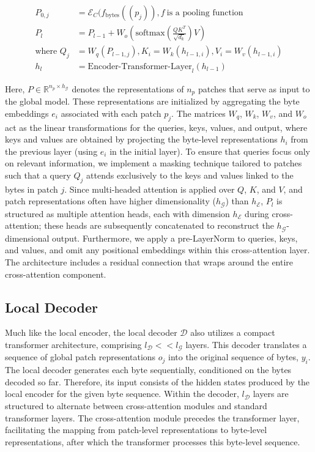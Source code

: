 \begin{align}
P_{0,j} &= \mathcal{E}_{C}(f_\text{bytes}((p_j)), f~ \text{is a pooling function} \\
P_l &= P_{l-1} + W_o\left(\text{softmax}\left(\frac{QK^T}{\sqrt{d_k}}\right)V\right) \\
\text{where } Q_j &= W_q(P_{l-1,j}), K_i = W_k(h_{l-1,i}), V_i = W_v(h_{l-1,i}) \\
h_l &= \text{Encoder-Transformer-Layer}_l(h_{l-1})
\end{align}

Here, $P \in \mathbb{R}^{n_p \times h_{\mathcal{G}}}$ denotes the representations of $n_p$ patches that serve as input to the global model. These representations are initialized by aggregating the byte embeddings $e_i$ associated with each patch $p_j$. The matrices $W_q$, $W_k$, $W_v$, and $W_o$ act as the linear transformations for the queries, keys, values, and output, where keys and values are obtained by projecting the byte-level representations $h_i$ from the previous layer (using $e_i$ in the initial layer). To ensure that queries focus only on relevant information, we implement a masking technique tailored to patches such that a query $Q_j$ attends exclusively to the keys and values linked to the bytes in patch $j$. Since multi-headed attention is applied over $Q$, $K$, and $V$, and patch representations often have higher dimensionality ($h_{\mathcal{G}}$) than $h_{\mathcal{E}}$, $P_l$ is structured as multiple attention heads, each with dimension $h_{\mathcal{E}}$ during cross-attention; these heads are subsequently concatenated to reconstruct the $h_{\mathcal{G}}$-dimensional output. Furthermore, we apply a pre-LayerNorm to queries, keys, and values, and omit any positional embeddings within this cross-attention layer. The architecture includes a residual connection that wraps around the entire cross-attention component.

\subsection{Local Decoder} 

Much like the local encoder, the local decoder $\mathcal{D}$ also utilizes a compact transformer architecture, comprising $l_{\mathcal{D}} << l_{\mathcal{G}}$ layers. This decoder translates a sequence of global patch representations $o_j$ into the original sequence of bytes, $y_i$. The local decoder generates each byte sequentially, conditioned on the bytes decoded so far. Therefore, its input consists of the hidden states produced by the local encoder for the given byte sequence. Within the decoder, $l_{\mathcal{D}}$ layers are structured to alternate between cross-attention modules and standard transformer layers. The cross-attention module precedes the transformer layer, facilitating the mapping from patch-level representations to byte-level representations, after which the transformer processes this byte-level sequence.

